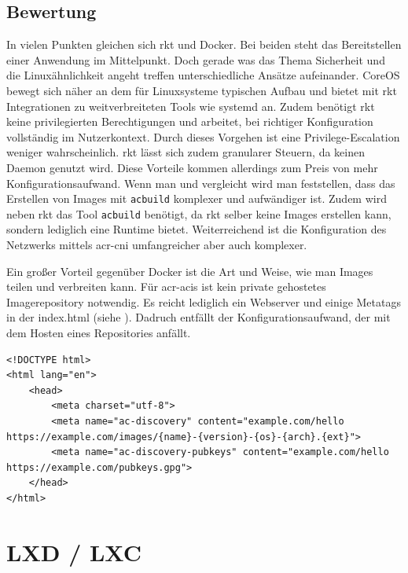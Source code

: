\subsection{Bewertung}
\label{sec:compRktBewertung}
In vielen Punkten gleichen sich rkt und Docker. Bei beiden steht das Bereitstellen einer Anwendung im Mittelpunkt. Doch gerade was das Thema Sicherheit und die Linuxähnlichkeit angeht treffen unterschiedliche Ansätze aufeinander. CoreOS bewegt sich näher an dem für Linuxsysteme typischen Aufbau und bietet mit rkt Integrationen zu weitverbreiteten Tools wie systemd an. Zudem benötigt rkt keine privilegierten Berechtigungen und arbeitet, bei richtiger Konfiguration vollständig im Nutzerkontext. Durch dieses Vorgehen ist eine Privilege-Escalation weniger wahrscheinlich. rkt lässt sich zudem granularer Steuern, da keinen Daemon genutzt wird. Diese Vorteile kommen allerdings zum Preis von mehr Konfigurationsaufwand. Wenn man  und  vergleicht wird man feststellen, dass das Erstellen von Images mit \texttt{acbuild} komplexer und aufwändiger ist. Zudem wird neben rkt das Tool \texttt{acbuild} benötigt, da rkt selber keine Images erstellen kann, sondern lediglich eine Runtime bietet. Weiterreichend ist die Konfiguration des Netzwerks mittels \gls{acr-cni} umfangreicher aber auch komplexer.

Ein großer Vorteil gegenüber Docker ist die Art und Weise, wie man Images teilen und verbreiten kann. Für \glspl{acr-aci} ist kein private gehostetes Imagerepository notwendig. Es reicht lediglich ein Webserver und einige Metatags in der index.html (siehe ). Dadruch entfällt der Konfigurationsaufwand, der mit dem Hosten eines Repositories anfällt.

\begin{listing}
	\begin{verbatim}
<!DOCTYPE html>
<html lang="en">
	<head>
		<meta charset="utf-8">
		<meta name="ac-discovery" content="example.com/hello https://example.com/images/{name}-{version}-{os}-{arch}.{ext}">
		<meta name="ac-discovery-pubkeys" content="example.com/hello https://example.com/pubkeys.gpg">
	</head>
</html>
	\end{verbatim}
	\caption{index.html mit Metatags um \glspl{acr-aci} bereitzustellen}
	\label{lst:rktReposHTML}
\end{listing}

\pagebreak

\section{LXD / LXC}
\label{sec:compLXD}

